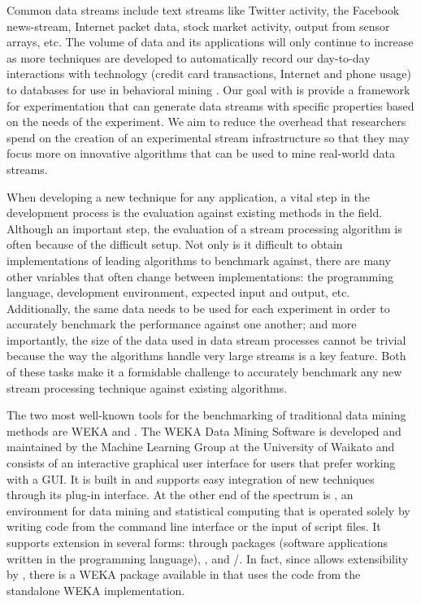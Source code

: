 \documentclass[nojss]{jss}
\begin{document}
Common data streams include text streams like Twitter activity, the Facebook news-stream, Internet packet data, stock market activity, output from sensor arrays, etc. The volume of data and its applications will only continue to increase as more techniques are developed to automatically record our day-to-day interactions with technology (credit card transactions, Internet and phone usage) to databases for use in behavioral mining \citep{stream:Aggarwal:2007}. Our goal with  is provide a framework for experimentation that can generate data streams with specific properties based on the needs of the experiment. We aim to reduce the overhead that researchers spend on the creation of an experimental stream infrastructure so that they may focus more on innovative algorithms that can be used to mine real-world data streams.


When developing a new technique for any application, a vital step in the development process is the evaluation against existing methods in the field. Although an important step, the evaluation of a stream processing algorithm is often because of the difficult setup. Not only is it difficult to obtain implementations of leading algorithms to benchmark against, there are many other variables that often change between implementations: the programming language, development environment, expected input and output, etc. Additionally, the same data needs to be used for each experiment in order to accurately benchmark the performance against one another; and more importantly, the size of the data used in data stream processes cannot be trivial because the way the algorithms handle very large streams is a key feature. Both of these tasks make it a formidable challenge to accurately benchmark any new stream processing technique against existing algorithms.


The two most well-known tools for the benchmarking of traditional data mining methods are WEKA and  \citep{stream:Hall+Frank+Holmes+Pfahringer+Reutemann+Witten:2009, stream:R:2005}. The WEKA Data Mining Software is developed and maintained by the Machine Learning Group at the University of Waikato and consists of an interactive graphical user interface for users that prefer working with a GUI. It is built in  and supports easy integration of new techniques through its plug-in interface. At the other end of the spectrum is , an environment for data mining and statistical computing that is operated solely by writing code from the command line interface or the input of script files. It supports extension in several forms: through  packages (software applications written in the  programming language), , and /. In fact, since  allows extensibility by , there is a WEKA package available in  that uses the  code from the standalone WEKA implementation.
\end{document}

